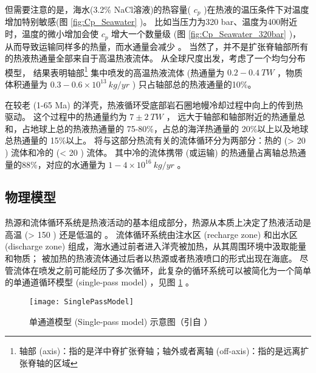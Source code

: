 但需要注意的是，海水(3.2\% NaCl溶液)的热容量( $ c_p $ )在热液的温压条件下对温度增加特别敏感(图 \ref{fig:Cp_Seawater} )。
比如当压力为320 bar、温度为400\ssd 附近时，温度的微小增加会使  $ c_p $ 增大一个数量级 (图 \ref{fig:Cp_Seawater_320bar} )，
从而导致运输同样多的热量，而水通量会减少  \citep{bischoff1985empirical,white1988heat,driesner2007system_part2} 。
当然了，并不是扩张脊轴部所有的热液热通量全部来自于高温热液流体。
 \cite{elderfield1996mid} 从全球尺度出发，考虑了一个均匀分布模型，
结果表明轴部\footnote{轴部 (axis)：指的是洋中脊扩张脊轴；轴外或者离轴 (off-axis)：指的是远离扩张脊轴的区域} 
集中喷发的高温热液流体 (热通量为  $ 0.2-0.4 \ TW $ ，物质体积通量为 $ 0.3-0.6 \times10^{13}  \ kg/yr $ ) 只占轴部总的热液通量的10\%。

在较老 (1-65 Ma) 的洋壳，热液循环受底部岩石圈地幔冷却过程中向上的传到热驱动。
这个过程中的热通量约为  $ 7 \pm 2 \ TW $   \cite{german2006hydrothermal} ，
远大于轴部和轴部附近的热通量总和，占地球上总的热液热通量的 75-80\%，占总的海洋热通量的 20\%以上以及地球总热通量的 15\%以上。
 \cite{mottl1994hydrothermal} 将与这部分热流有关的流体循环分为两部分：热的 (> 20 \ssd) 流体和冷的 (< 20 \ssd) 流体。
其中冷的流体携带 (或运输) 的热通量占离轴总热通量的88\%，对应的水通量为  $ 1-4 \times 10^{16}  \ kg/yr $   \citep{german2006hydrothermal} 。


\subsection{物理模型}  %
热源和流体循环系统是热液活动的基本组成部分，热源从本质上决定了热液活动是高温 (> 150 \ssd) 还是低温的 \citep{LOWELL2014} 。
流体循环系统由注水区 (recharge zone) 和出水区 (discharge zone) 组成，海水通过前者进入洋壳被加热，从其周围环境中汲取能量和物质；
被加热的热液流体通过后者以热源或者热液喷口的形式出现在海底。
尽管流体在喷发之前可能经历了多次循环，此复杂的循环系统可以被简化为一个简单的单通道循环模型 (single-pass model)  \cite{LOWELL2014} ，见图 \ref{fig:SinglePassModel} 。

\begin{figure} [htbp]
	\centering%
	\texttt{[image: SinglePassModel]} 
	\caption[单通道模型示意图]{单通道模型 (Single-pass model) 示意图（引自 \cite{LOWELL2014} ）} 
	\label{fig:SinglePassModel} 
\end{figure} 


